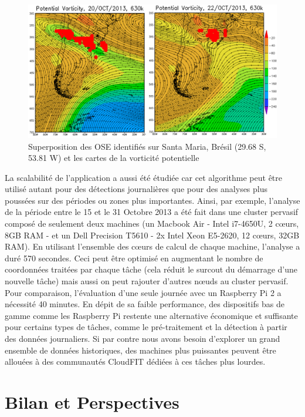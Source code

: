 \begin{figure}
	\centering
	\includegraphics[width=0.55\linewidth]{img/comparison2}
	\vspace{-0.2cm}
	\caption{Superposition des OSE identifiés sur Santa Maria, Brésil (29.68 S, 53.81 W)  et les cartes de la vorticité potentielle}\label{fig:comparison}
\end{figure}

La scalabilité de l'application a aussi été étudiée car cet algorithme peut être utilisé autant pour des détections journalières que pour des analyses plus poussées sur des périodes ou zones plus importantes. Ainsi, par exemple, l'analyse de la période entre le 15 et le 31 Octobre 2013 a été fait dans une cluster pervasif composé de seulement deux machines (un Macbook Air  - Intel i7-4650U, 2 c{\oe}urs, 8GB RAM -  et un Dell Precision T5610 - 2x Intel Xeon E5-2620, 12 c{\oe}urs, 32GB RAM). En utilisant l'ensemble des c{\oe}urs de calcul de chaque machine, l'analyse a duré 570 secondes. Ceci peut être optimisé en augmentant le nombre de coordonnées traitées par chaque tâche (cela réduit le surcout du démarrage d'une nouvelle tâche) mais aussi on peut rajouter d'autres n{\oe}uds au cluster pervasif. Pour comparaison, l'évaluation d'une seule journée avec un Raspberry Pi 2 a nécessité 40 minutes. En dépit de sa faible performance, des dispositifs bas de gamme comme les Raspberry Pi restente une alternative économique et suffisante pour certains types de tâches, comme le pré-traitement et la détection à partir des données journaliers. Si par contre nous avons besoin d'explorer un grand ensemble de données historiques, des machines plus puissantes peuvent être allouées à des communautés CloudFIT dédiées à ces tâches plus lourdes. 

\section{Bilan et Perspectives}